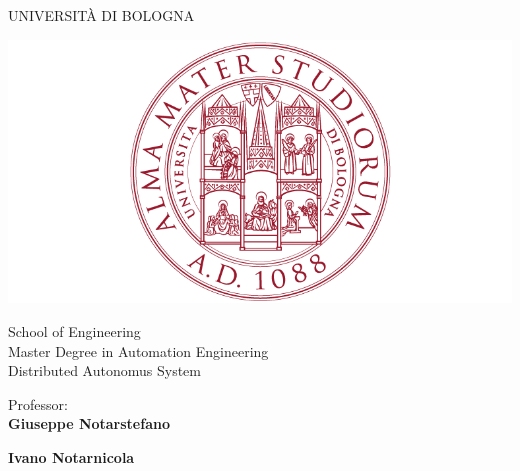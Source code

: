 
\thispagestyle{empty}                                                 
\begin{center}                                                            
    \vspace{5mm}
    {\LARGE UNIVERSITÀ DI BOLOGNA} \\                       
      \vspace{5mm}
\end{center}
\begin{center}
  \includegraphics[scale=.27]{img/0-Front-page/logo_unibo}
\end{center}
\begin{center}
      \vspace{5mm}
      {\LARGE School of Engineering} \\
        \vspace{3mm}
      {\Large Master Degree in Automation Engineering} \\
      \vspace{20mm}
      {\LARGE Distributed Autonomus System} \\
      \vspace{10mm}
\end{center}
\begin{flushleft}                                                                              
     {\large Professor:} \\
       \vspace{0.3 cm}
       \large{{\textbf{Giuseppe Notarstefano}}}

       \vspace{0.1 cm}
       \large{{\textbf{Ivano Notarnicola}}}       
     \vspace{13mm}
\end{flushleft}
